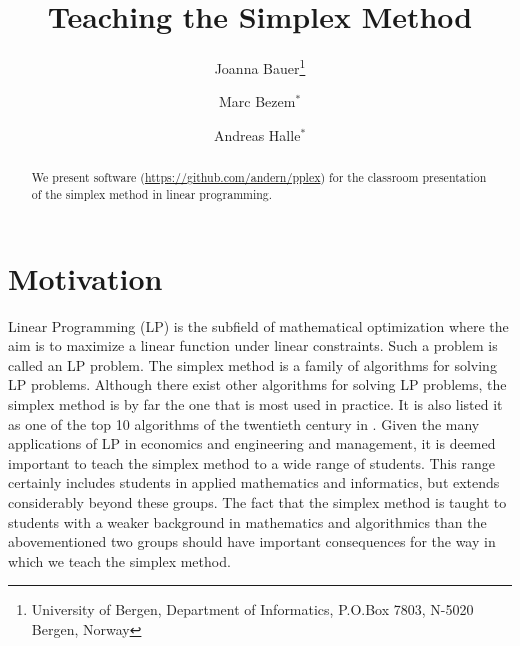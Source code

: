 \documentclass[ukenglish]{nik}
\begin{document}
\title{Teaching the Simplex Method}

\author{
Joanna Bauer\thanks{University of Bergen, Department of Informatics, P.O.Box 7803, N-5020 Bergen, Norway}
\and
Marc Bezem$^*$
\and
Andreas Halle$^*$}


\begin{abstract}
We present software (\url{https://github.com/andern/pplex})
for the classroom presentation of the simplex method in linear programming.
\end{abstract}

\section{Motivation}
Linear Programming (LP) is the subfield of mathematical optimization where
the aim is to maximize a linear function under linear constraints. Such a problem
is called an LP problem. The simplex method is a family of algorithms for solving LP problems. 
Although there exist other algorithms for solving LP problems,
the simplex method is by far the one that is most used in practice.
It is also listed it as one of the top 10 algorithms of the twentieth century in
\cite{CiSaE2000}. Given the many applications of LP in economics and engineering and
management, it is deemed important to teach the simplex method to a wide range of
students. This range certainly includes students in applied mathematics and informatics,
but extends considerably beyond these groups. The fact that the simplex method is
taught to students with a weaker background in mathematics and algorithmics than
the abovementioned two groups should have important consequences for the way
in which we teach the simplex method.
\end{document}
